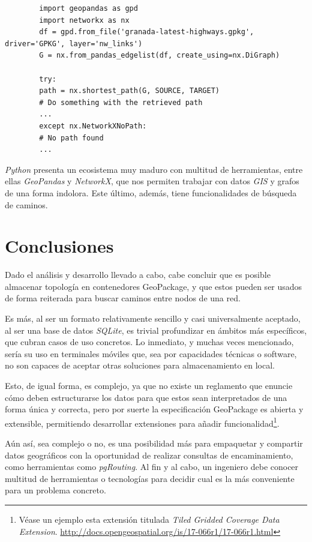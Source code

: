 	\begin{listing}[htbp]
		\begin{verbatim}
		import geopandas as gpd
		import networkx as nx
		df = gpd.from_file('granada-latest-highways.gpkg', driver='GPKG', layer='nw_links')
		G = nx.from_pandas_edgelist(df, create_using=nx.DiGraph)
		
		try:
		path = nx.shortest_path(G, SOURCE, TARGET)
		# Do something with the retrieved path
		...
		except nx.NetworkXNoPath:
		# No path found
		...				
		\end{verbatim}
		\caption[Encaminamiento con \textit{GeoPackage} y \textit{NetworkX}]{\textit{Python} presenta un ecosistema muy maduro con multitud de herramientas, entre ellas \textit{GeoPandas} y \textit{NetworkX}, que nos permiten trabajar con datos \textit{GIS} y grafos de una forma indolora. Este último, además, tiene funcionalidades de búsqueda de caminos.}
	\end{listing}

\section{Conclusiones}
Dado el análisis y desarrollo llevado a cabo, cabe concluir que es posible almacenar topología en contenedores GeoPackage, y que estos pueden ser usados de forma reiterada para buscar caminos entre nodos de una red.

Es más, al ser un formato relativamente sencillo y casi universalmente aceptado, al ser una base de datos \textit{SQLite}, es trivial profundizar en ámbitos más específicos, que cubran casos de uso concretos. Lo inmediato, y muchas veces mencionado, sería su uso en terminales móviles que, sea por capacidades técnicas o software, no son capaces de aceptar otras soluciones para almacenamiento en local.

Esto, de igual forma, es complejo, ya que no existe un reglamento que enuncie cómo deben estructurarse los datos para que estos sean interpretados de una forma única y correcta, pero por suerte la especificación GeoPackage es abierta y extensible, permitiendo desarrollar extensiones para añadir funcionalidad\footnote{Véase un ejemplo esta extensión titulada \textit{Tiled Gridded Coverage Data Extension}.  \url{http://docs.opengeospatial.org/is/17-066r1/17-066r1.html}}.

Aún así, sea complejo o no, es una posibilidad más para empaquetar y compartir datos geográficos con la oportunidad de realizar consultas de encaminamiento, como herramientas como \textit{pgRouting}. Al fin y al cabo, un ingeniero debe conocer multitud de herramientas o tecnologías para decidir cual es la más conveniente para un problema concreto.